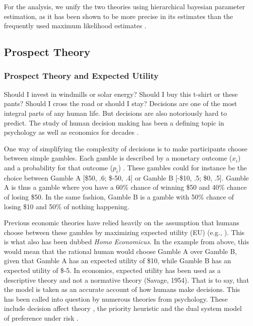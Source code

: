 \documentclass{article}
\begin{document}
For the analysis, we unify the two theories using hierarchical bayesian parameter estimation, as it has been shown to be more precise in its estimates than the frequently used maximum likelihood estimates \cite{nilsson2011jomp}.

    \subsection{Prospect Theory}
    \subsubsection{Prospect Theory and Expected Utility}
    Should I invest in windmills or solar energy? Should I buy this t-shirt or these pants? Should I cross the road or should I stay? 
Decisions are one of the most integral parts of any human life. But decisions are also notoriously hard to predict. The study of human decision making has been a defining topic in psychology as well as economics for decades \cite{nilsson2011jomp}. 

One way of simplifying the complexity of decisions is to make participants choose between simple gambles. Each gamble is described by a monetary outcome ($x_i$) and a probability for that outcome ($p_i$) \cite{nilsson2011jomp}. These gambles could for instance be the choice between Gamble A [\$50, .6; \$-50, .4] or Gamble B [-\$10, .5; \$0, .5]. Gamble A is thus a gamble where you have a 60\% chance of winning \$50 and 40\% chance of losing \$50. In the same fashion, Gamble B is a gamble with 50\% chance of losing \$10 and 50\% of nothing happening. 

Previous economic theories have relied heavily on the assumption that humans choose between these gambles by maximizing expected utility (EU) (e.g., ). This is what also has been dubbed \textit{Homo Economicus}. In the example from above, this would mean that the rational human would choose Gamble A over Gamble B, given that Gamble A has an expected utility of \$10, while Gamble B has an expected utility of \$-5. 
In economics, expected utility has been used as a descriptive theory and not a normative theory (Savage, 1954). That is to say, that the model is taken as an accurate account of how humans make decisions. This has been called into question by numerous theories from psychology. These include decision affect theory \cite{mellers2000choice}, the priority heuristic \cite{brandstatter2006priority} and the dual system model of preference under risk \cite{mukherjee2010dual}. 
\end{document}
